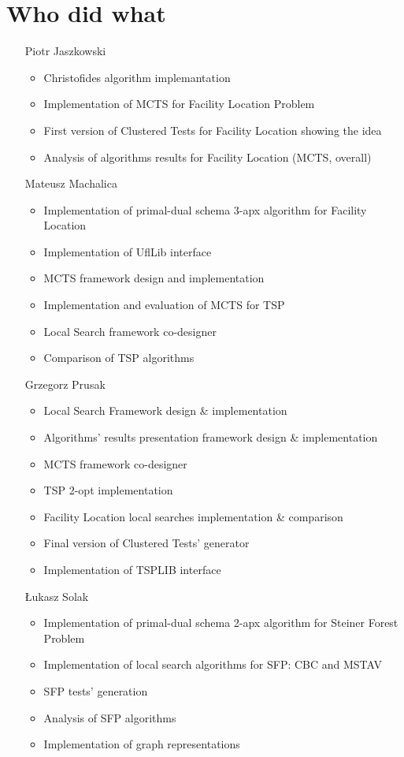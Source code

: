 \documentclass[licencjacka]{pracamgr}
\begin{document}
\chapter*{Who did what}
\begin{itemize}
	\item[Piotr Jaszkowski]
		\begin{itemize}
			\item Christofides algorithm implemantation
			\item Implementation of MCTS for Facility Location Problem
			\item First version of Clustered Tests for Facility Location showing the idea
			\item Analysis of algorithms results for Facility Location
				(MCTS, overall)
		\end{itemize}
	\item[Mateusz Machalica]
		\begin{itemize}
			\item Implementation of primal-dual schema 3-apx algorithm for Facility Location
      \item Implementation of UflLib interface
      \item MCTS framework design and implementation
      \item Implementation and evaluation of MCTS for TSP
      \item Local Search framework co-designer
      \item Comparison of TSP algorithms
		\end{itemize}
	\item[Grzegorz Prusak]
	  \begin{itemize}
        \item Local Search Framework design \& implementation
        \item Algorithms' results presentation framework design \& implementation
        \item MCTS framework co-designer
        \item TSP 2-opt implementation
        \item Facility Location local searches implementation \& comparison
		\item Final version of Clustered Tests' generator
        \item Implementation of TSPLIB interface
	  \end{itemize}
	\item[Łukasz Solak]
		\begin{itemize}
			\item Implementation of primal-dual schema 2-apx algorithm for Steiner Forest Problem
      \item Implementation of local search algorithms for SFP: CBC and MSTAV
      \item SFP tests' generation
      \item Analysis of SFP algorithms
      \item Implementation of graph representations
		\end{itemize}
\end{itemize}
\end{document}
